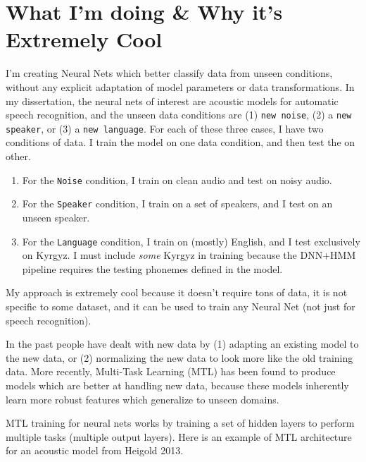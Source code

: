 \documentclass[10pt,a4paper]{article}
\begin{document}
\section{What I'm doing \& Why it's Extremely Cool}

I'm creating Neural Nets which better classify data from unseen conditions, without any explicit adaptation of model parameters or data transformations. In my dissertation, the neural nets of interest are acoustic models for automatic speech recognition, and the unseen data conditions are (1) \texttt{new noise}, (2) a \texttt{new speaker}, or (3) a \texttt{new language}. For each of these three cases, I have two conditions of data. I train the model on one data condition, and then test the on other.

\begin{enumerate}
  
\item For the \texttt{Noise} condition, I train on clean audio and test on noisy audio.
\item For the \texttt{Speaker} condition, I train on a set of speakers, and I test on an unseen speaker.
\item For the \texttt{Language} condition, I train on (mostly) English, and I test exclusively on Kyrgyz. I must include \textit{some} Kyrgyz in training because the DNN+HMM pipeline requires the testing phonemes defined in the model.  
  
\end{enumerate}
    
My approach is extremely cool because it doesn't require tons of data, it is not specific to some dataset, and it can be used to train any Neural Net (not just for speech recognition).

In the past people have dealt with new data by (1) adapting an existing model to the new data, or (2) normalizing the new data to look more like the old training data. More recently, Multi-Task Learning (MTL) has been found to produce models which are better at handling new data, because these models inherently learn more robust features which generalize to unseen domains. 

MTL training for neural nets works by training a set of hidden layers to perform multiple tasks (multiple output layers). Here is an example of MTL architecture for an acoustic model from Heigold 2013.
\end{document}
